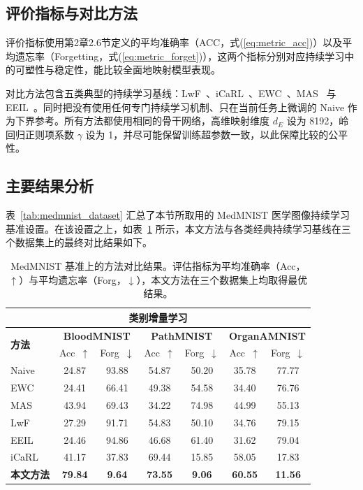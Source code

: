 \subsection{评价指标与对比方法}

评价指标使用第2章2.6节定义的平均准确率（ACC，式(\ref{eq:metric_acc})）以及平均遗忘率（Forgetting，式(\ref{eq:metric_forget})），这两个指标分别对应持续学习中的可塑性与稳定性，能比较全面地映射模型表现。

对比方法包含五类典型的持续学习基线：LwF~\citep{li2017learning}、iCaRL~\citep{rebuffi2017icarl}、EWC~\citep{kirkpatrick2017ewc}、MAS~\citep{aljundi2018memory} 与 EEIL~\citep{castro2018end}。同时把没有使用任何专门持续学习机制、只在当前任务上微调的 Naive 作为下界参考。所有方法都使用相同的骨干网络，高维映射维度 $d_E$ 设为 8192，岭回归正则项系数 $\gamma$ 设为 1，并尽可能保留训练超参数一致，以此保障比较的公平性。

\subsection{主要结果分析}

表~\ref{tab:medmnist_dataset} 汇总了本节所取用的 MedMNIST 医学图像持续学习基准设置。在该设置之上，如表~\ref{tab:medmnist_cil} 所示，本文方法与各类经典持续学习基线在三个数据集上的最终对比结果如下。

\begin{table}[!htbp]
\centering
\caption{MedMNIST 基准上的方法对比结果。评估指标为平均准确率（Acc，$\uparrow$）与平均遗忘率（Forg，$\downarrow$），本文方法在三个数据集上均取得最优结果。}
\setlength{\tabcolsep}{4pt}
\renewcommand{\arraystretch}{1.1}
\begin{tabular}{lcccccc}
\toprule
\multicolumn{7}{c}{\textbf{类别增量学习}}\\
\midrule
\multirow{2}{*}{\textbf{方法}} &
\multicolumn{2}{c}{\textbf{BloodMNIST}} &
\multicolumn{2}{c}{\textbf{PathMNIST}} &
\multicolumn{2}{c}{\textbf{OrganAMNIST}}  \\  \cmidrule(lr){2-3} \cmidrule(lr){4-5} \cmidrule(lr){6-7}
 & Acc~$\uparrow$ & Forg~$\downarrow$ & Acc~$\uparrow$ & Forg~$\downarrow$ & Acc~$\uparrow$ & Forg~$\downarrow$ \\
\midrule
Naive & 24.87 & 93.88 & 54.87 & 50.20 & 35.78 & 77.77 \\
EWC~\citep{kirkpatrick2017ewc}   & 24.41 & 66.41 & 49.38 & 54.58 & 34.40 & 76.76 \\
MAS~\citep{aljundi2018memory}    & 43.94 & 69.43 & 34.22 & 74.98 & 44.99 & 55.13 \\
LwF~\citep{li2017learning}       & 27.29 & 91.71 & 54.83 & 50.10 & 34.76 & 79.15 \\
EEIL~\citep{castro2018end}       & 24.46 & 94.86 & 46.68 & 61.40 & 31.62 & 79.04 \\
iCaRL~\citep{rebuffi2017icarl}   & 41.17 & 37.83 & 69.44 & 15.85 & 58.05 & 17.83 \\
\midrule
\textbf{本文方法} & \textbf{79.84} & \textbf{9.64} & \textbf{73.55} & \textbf{9.06} & \textbf{60.55} & \textbf{11.56} \\
\bottomrule
\end{tabular}
\label{tab:medmnist_cil}
\end{table}


